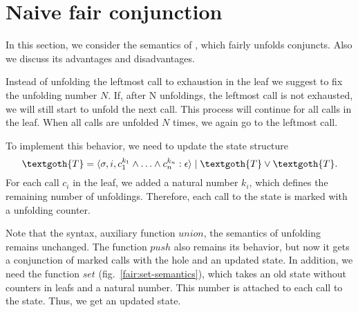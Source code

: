 \section{Naive fair conjunction}

In this section, we consider the semantics of \mk, which fairly unfolds conjuncts. Also we discuss its advantages and disadvantages.

Instead of unfolding the leftmost call to exhaustion in the leaf we suggest to fix the unfolding number $N$.  If, after N unfoldings, the leftmost call is not exhausted, we will still start to unfold the next call. This process will continue for all calls in the leaf. When all calls are unfolded $N$ times, we again go to the leftmost call.

To implement this behavior, we need to update the state structure
\[
\textgoth{T} = \inbr{\sigma, i, c_1^{k_1} \land \ldots \land c_n^{k_n} : \epsilon} \mid \textgoth{T} \lor \textgoth{T}.
\]
For each call $c_i$ in the leaf, we added a natural number $k_i$, which defines the remaining number of unfoldings. Therefore, each call to the state is marked with a unfolding counter. 

Note that the syntax, auxiliary function $union$, the semantics of unfolding remains unchanged. The function $push$ also remains its behavior, but now it gets a conjunction of marked calls with the hole and an updated state. In addition, we need the function $set$ (fig.~\ref{fair:set-semantics}), which takes an old state without counters in leafs and a natural number. This number is attached to each call to the state. Thus, we get an updated state. 

